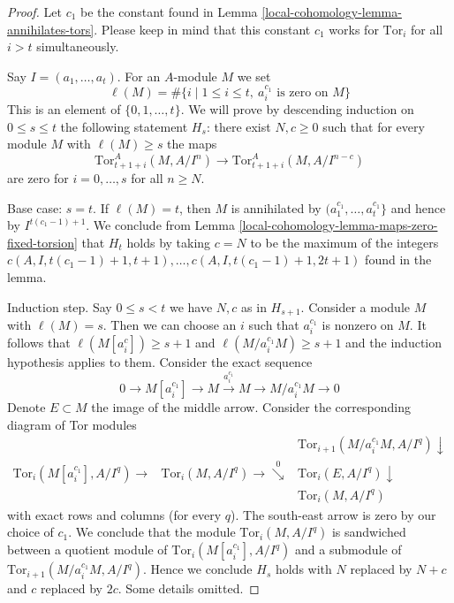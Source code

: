 \begin{proof}
Let $c_1$ be the constant found in Lemma \ref{local-cohomology-lemma-annihilates-tors}.
Please keep in mind that this constant $c_1$ works for $\text{Tor}_i$ for all
$i > t$ simultaneously.

\medskip\noindent
Say $I = (a_1, \ldots, a_t)$. For an $A$-module $M$ we set
$$
\ell(M) =
\#\{i \mid 1 \leq i \leq t,\ a_i^{c_1}\text{ is zero on }M\}
$$
This is an element of $\{0, 1, \ldots, t\}$.
We will prove by descending induction on $0 \leq s \leq t$
the following statement $H_s$: there exist $N, c \geq 0$ such that
for every module $M$ with $\ell(M) \geq s$ the maps
$$
\text{Tor}_{t + 1 + i}^A(M, A/I^n) \to \text{Tor}_{t + 1 + i}^A(M, A/I^{n - c})
$$
are zero for $i = 0, \ldots, s$ for all $n \geq N$.

\medskip\noindent
Base case: $s = t$. If $\ell(M) = t$, then $M$ is annihilated by
$(a_1^{c_1}, \ldots, a_t^{c_1}\}$ and hence by
$I^{t(c_1 - 1) + 1}$. We conclude from
Lemma \ref{local-cohomology-lemma-maps-zero-fixed-torsion}
that $H_t$ holds by taking $c = N$ to be the maximum of the integers
$c(A, I, t(c_1 - 1) + 1, t + 1), \ldots, c(A, I, t(c_1 - 1) + 1, 2t + 1)$
found in the lemma.

\medskip\noindent
Induction step. Say $0 \leq s < t$ we have $N, c$ as in $H_{s + 1}$.
Consider a module $M$ with $\ell(M) = s$. Then we can choose an $i$
such that $a_i^{c_1}$ is nonzero on $M$. It follows that
$\ell(M[a_i^c]) \geq s + 1$ and $\ell(M/a_i^{c_1}M) \geq s + 1$
and the induction hypothesis applies to them.
Consider the exact sequence
$$
0 \to M[a_i^{c_1}] \to M \xrightarrow{a_i^{c_1}} M \to M/a_i^{c_1}M \to 0
$$
Denote $E \subset M$ the image of the middle arrow.
Consider the corresponding diagram of Tor modules
$$
\begin{array}{ccc} &  & \text{Tor}_{i + 1}(M/a_i^{c_1}M, A/I^q) \downarrow \\ \text{Tor}_i(M[a_i^{c_1}], A/I^q) \longrightarrow & \text{Tor}_i(M, A/I^q) \longrightarrow\overset{0}{\searrow} & \text{Tor}_i(E, A/I^q) \downarrow \\  &  & \text{Tor}_i(M, A/I^q)\end{array}
$$
with exact rows and columns (for every $q$). The south-east arrow
is zero by our choice of $c_1$. We conclude that the
module $\text{Tor}_i(M, A/I^q)$ is sandwiched between
a quotient module of $\text{Tor}_i(M[a_i^{c_1}], A/I^q)$
and a submodule of $\text{Tor}_{i + 1}(M/a_i^{c_1}M, A/I^q)$.
Hence we conclude $H_s$ holds with $N$ replaced by $N + c$
and $c$ replaced by $2c$. Some details omitted.
\end{proof}

